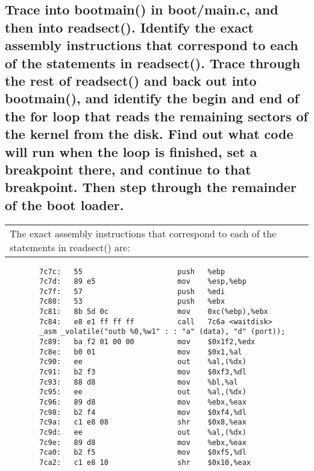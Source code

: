 \documentclass[a4paper]{article}
\begin{document}
	\subsection{Trace into bootmain() in boot/main.c, and then into readsect(). Identify the exact assembly instructions that correspond to each of the statements in readsect(). Trace through the rest of readsect() and back out into bootmain(), and identify the begin and end of the for loop that reads the remaining sectors of the kernel from the disk. Find out what code will run when the loop is finished, set a breakpoint there, and continue to that breakpoint. Then step through the remainder of the boot loader.} 
		\begin{center}
		\begin{tabularx}{0.95\textwidth}{L{1}}
			\textbullet \quad The exact assembly instructions that correspond to each of the statements in readsect() are:
		\end{tabularx}
		\end{center}
\begin{minipage}{0.5\textwidth}
	\begin{lstlisting}
		7c7c:	55                   	push   %ebp
		7c7d:	89 e5                	mov    %esp,%ebp
		7c7f:	57                   	push   %edi
		7c80:	53                   	push   %ebx
		7c81:	8b 5d 0c             	mov    0xc(%ebp),%ebx
		7c84:	e8 e1 ff ff ff       	call   7c6a <waitdisk>
		_asm _volatile("outb %0,%w1" : : "a" (data), "d" (port));
		7c89:	ba f2 01 00 00       	mov    $0x1f2,%edx
	    7c8e:	b0 01                	mov    $0x1,%al
		7c90:	ee                   	out    %al,(%dx)
		7c91:	b2 f3                	mov    $0xf3,%dl
		7c93:	88 d8                	mov    %bl,%al
		7c95:	ee                   	out    %al,(%dx)
		7c96:	89 d8                	mov    %ebx,%eax
		7c98:	b2 f4                	mov    $0xf4,%dl
		7c9a:	c1 e8 08             	shr    $0x8,%eax
		7c9d:	ee                   	out    %al,(%dx)
		7c9e:	89 d8                	mov    %ebx,%eax
		7ca0:	b2 f5                	mov    $0xf5,%dl
		7ca2:	c1 e8 10             	shr    $0x10,%eax
	\end{lstlisting}
\end{minipage}
\end{document}
